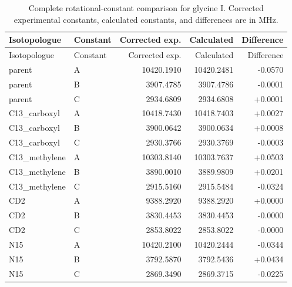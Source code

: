\documentclass[12pt]{article}
\begin{document}
\begin{longtable}{llrrr}
\caption{Complete rotational-constant comparison for glycine I. Corrected experimental constants, calculated constants, and differences are in MHz.}\label{tab:si-glycine-I-rotconstants}\\
\toprule
Isotopologue & Constant & Corrected exp. & Calculated & Difference \\
\midrule
\endfirsthead
\toprule
Isotopologue & Constant & Corrected exp. & Calculated & Difference \\
\midrule
\endhead
parent & A & 10420.1910 & 10420.2481 & -0.0570 \\
parent & B & 3907.4785 & 3907.4786 & -0.0001 \\
parent & C & 2934.6809 & 2934.6808 & +0.0001 \\
C13\_carboxyl & A & 10418.7430 & 10418.7403 & +0.0027 \\
C13\_carboxyl & B & 3900.0642 & 3900.0634 & +0.0008 \\
C13\_carboxyl & C & 2930.3766 & 2930.3769 & -0.0003 \\
C13\_methylene & A & 10303.8140 & 10303.7637 & +0.0503 \\
C13\_methylene & B & 3890.0010 & 3889.9809 & +0.0201 \\
C13\_methylene & C & 2915.5160 & 2915.5484 & -0.0324 \\
CD2 & A & 9388.2920 & 9388.2920 & +0.0000 \\
CD2 & B & 3830.4453 & 3830.4453 & -0.0000 \\
CD2 & C & 2853.8022 & 2853.8022 & -0.0000 \\
N15 & A & 10420.2100 & 10420.2444 & -0.0344 \\
N15 & B & 3792.5870 & 3792.5436 & +0.0434 \\
N15 & C & 2869.3490 & 2869.3715 & -0.0225 \\
\bottomrule
\end{longtable}
\end{document}
